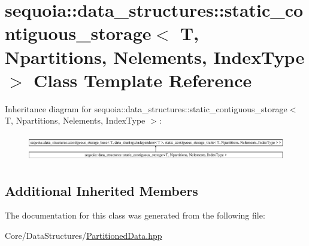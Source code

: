 \hypertarget{classsequoia_1_1data__structures_1_1static__contiguous__storage}{}\section{sequoia\+::data\+\_\+structures\+::static\+\_\+contiguous\+\_\+storage$<$ T, Npartitions, Nelements, Index\+Type $>$ Class Template Reference}
\label{classsequoia_1_1data__structures_1_1static__contiguous__storage}
Inheritance diagram for sequoia\+::data\+\_\+structures\+::static\+\_\+contiguous\+\_\+storage$<$ T, Npartitions, Nelements, Index\+Type $>$\+:\begin{figure}[H]
\begin{center}
\leavevmode
\includegraphics[height=1.181435cm]{classsequoia_1_1data__structures_1_1static__contiguous__storage}
\end{center}
\end{figure}
\subsection*{Additional Inherited Members}


The documentation for this class was generated from the following file\+:\begin{DoxyCompactItemize}
\item 
Core/\+Data\+Structures/\mbox{\hyperlink{_partitioned_data_8hpp}{Partitioned\+Data.\+hpp}}\end{DoxyCompactItemize}
